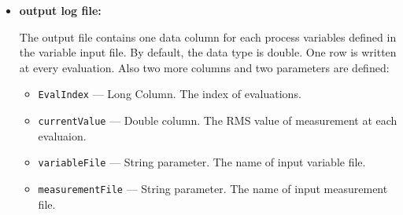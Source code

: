 \begin{itemize}
\begin{itemize}
\item {\bf output log file:} \par
The output file contains one data column for each process variables defined in the variable 
input file. By default, the data type is double. One row is written at every evaluation.
Also two more columns and two parameters are defined: 
\begin{itemize}
        \item {\tt EvalIndex} --- Long Column. The index of evaluations.
        \item {\tt currentValue} --- Double column. The RMS value of measurement at each evaluaion.
        \item {\tt variableFile} --- String parameter. The name of input variable file.
        \item {\tt measurementFile} --- String parameter. The name of input measurement file.
\end{itemize}

\end{itemize}


\end{itemize}
